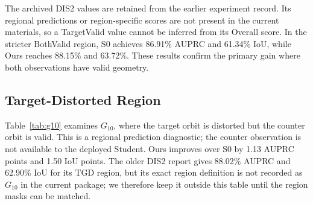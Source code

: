 \begin{table}[t]
\caption{Target-valid primary comparison and full-region check (\%). For rows with both regions, the same predictions are scored twice. The archived DIS2 record provides only Overall metrics; its TargetValid cells remain unfilled.}
\label{tab:primary}
\centering\scriptsize
{}
\end{table}

The archived DIS2 values are retained from the earlier experiment record. Its regional predictions or region-specific scores are not present in the current materials, so a TargetValid value cannot be inferred from its Overall score. In the stricter BothValid region, S0 achieves 86.91\% AUPRC and 61.34\% IoU, while Ours reaches 88.15\% and 63.72\%. These results confirm the primary gain where both observations have valid geometry.

\subsection{Target-Distorted Region}
Table~\ref{tab:g10} examines $G_{10}$, where the target orbit is distorted but the counter orbit is valid. This is a regional prediction diagnostic; the counter observation is not available to the deployed Student. Ours improves over S0 by 1.13 AUPRC points and 1.50 IoU points. The older DIS2 report gives 88.02\% AUPRC and 62.90\% IoU for its TGD region, but its exact region definition is not recorded as $G_{10}$ in the current package; we therefore keep it outside this table until the region masks can be matched.

